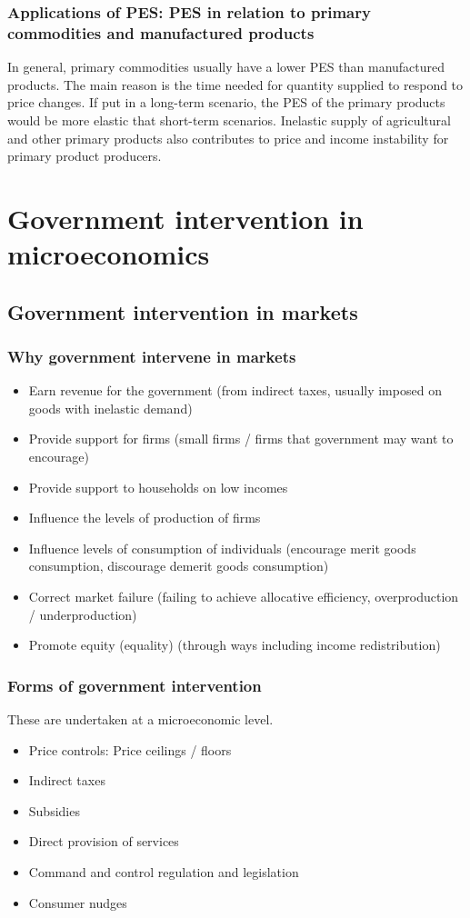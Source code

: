 \documentclass[a4paper,12pt]{article}
\begin{document}
\subsubsection*{Applications of PES: PES in relation to primary commodities and manufactured products}
In general, primary commodities usually have a lower PES than manufactured products. The main reason
is the time needed for quantity supplied to respond to price changes. If put in a long-term scenario, the PES of the primary products would be more elastic that short-term scenarios. Inelastic supply of agricultural and other primary products also contributes to price and income instability for
primary product producers.
\section{Government intervention in microeconomics}
\subsection{Government intervention in markets}
\subsubsection*{Why government intervene in markets}
\begin{itemize}
  \item Earn revenue for the government (from indirect taxes, usually imposed on goods with inelastic demand)
  \item Provide support for firms (small firms / firms that government may want to encourage)
  \item Provide support to households on low incomes
  \item Influence the levels of production of firms
  \item Influence levels of consumption of individuals (encourage merit goods consumption, discourage demerit goods consumption)
  \item Correct market failure (failing to achieve allocative efficiency, overproduction / underproduction)
  \item Promote equity (equality) (through ways including income redistribution)
\end{itemize}
\subsubsection*{Forms of government intervention}
These are undertaken at a microeconomic level.
\begin{itemize}
  \item Price controls: Price ceilings / floors
  \item Indirect taxes
  \item Subsidies
  \item Direct provision of services
  \item Command and control regulation and legislation
  \item Consumer nudges
\end{itemize}
\end{document}
